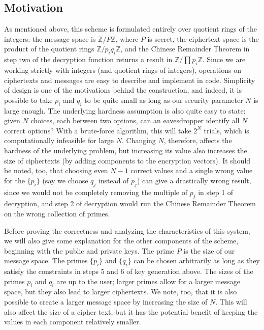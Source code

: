 \documentclass[11pt]{report}
\newcommand{\Z}{\mathbb{Z}}
\newcommand{\ZP}{\mathbb{Z}/P\mathbb{Z}}
\begin{document}
\subsection{Motivation}

As mentioned above, this scheme is formulated entirely over quotient rings of the integers: the message space is $\ZP$, where $P$ is secret, the ciphertext space is the product of the quotient rings $\Z/p_iq_i\Z$, and the Chinese Remainder Theorem in step two of the decryption function returns a result in $\Z/\prod p_i\Z$. Since we are working strictly with integers (and quotient rings of integers), operations on ciphertexts and messages are easy to describe and implement in code. Simplicity of design is one of the motivations behind the construction, and indeed, it is possible to take $p_i$ and $q_i$ to be quite small as long as our security parameter $N$ is large enough. The underlying hardness assumption is also quite easy to state: given $N$ choices, each between two options, can an eavesdropper identify all $N$ correct options? With a brute-force algorithm, this will take $2^N$ trials, which is computationally infeasible for large $N$. Changing $N$, therefore, affects the hardness of the underlying problem, but increasing its value also increases the size of ciphertexts (by adding components to the encryption vectors). It should be noted, too, that choosing even $N-1$ correct values and a single wrong value for the $\{p_i\}$ (say we choose $q_j$ instead of $p_j$) can give a drastically wrong result, since we would not be completely removing the multiple of $p_j$ in step 1 of decryption, and step 2 of decryption would run the Chinese Remainder Theorem on the wrong collection of primes.

Before proving the correctness and analyzing the characteristics of this system, we will also give some explanation for the other components of the scheme, beginning with the public and private keys. The prime $P$ is the size of our message space. The primes $\{p_i\}$ and $\{q_i\}$ can be chosen arbitrarily as long as they satisfy the constraints in steps 5 and 6 of key generation above. The sizes of the primes $p_i$ and $q_i$ are up to the user; larger primes allow for a larger message space, but they also lead to larger ciphertexts. We note, too, that it is also possible to create a larger message space by increasing the size of $N$. This will also affect the size of a cipher text, but it has the potential benefit of keeping the values in each component relatively smaller.
\end{document}

